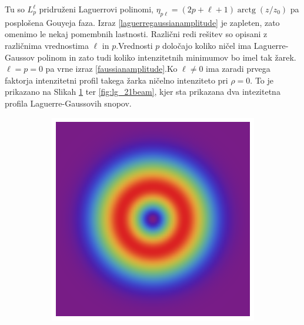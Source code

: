 \documentclass[longbibliography,slovene,a4paper,12pt]{book}
\DeclareMathOperator{\arctg}{arctg}
\begin{document}
Tu so $L_p^\ell$ pridruženi Laguerrovi polinomi, $\eta_{p\ell} = (2p + \ell + 1) \arctg(z/z_0)$ pa posplošena Gouyeja faza. Izraz \ref{laguerregaussianamplitude} je zapleten, zato omenimo le nekaj pomembnih lastnosti. Različni redi rešitev so opisani z različnima vrednostima $\ell$ in $p$.Vrednosti $p$ določajo koliko ničel ima Laguerre-Gaussov polinom in zato tudi koliko intenzitetnih minimumov bo imel tak žarek. $\ell=p=0$ pa vrne izraz \ref{faussianamplitude}.Ko $\ell \neq 0$ ima zaradi prvega faktorja intenzitetni profil takega žarka ničelno intenziteto pri $\rho = 0$. To je prikazano na Slikah \ref{fig:lg_01beam} ter \ref{fig:lg_21beam}, kjer sta prikazana dva intezitetna profila Laguerre-Gaussovih snopov.
\begin{figure}[h!]
	\centering
	\begin{subfigure}[b]{0.31\textwidth}
	\includegraphics[width=\textwidth]{slike/lg_01.png}
	\label{fig:lg_01beam}
	\end{subfigure}
	\begin{subfigure}[b]{0.31\textwidth}

\end{subfigure}
\end{figure}
\end{document}
